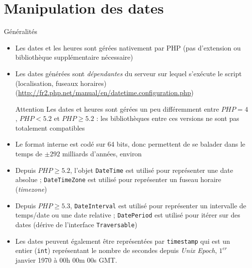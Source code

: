 
\section{Manipulation des dates}

\begin{frame}{Généralités}
	\begin{itemize}
		\item Les dates et les heures sont gérées nativement par PHP (pas d’extension ou bibliothèque supplémentaire nécessaire)
		\item Les dates générées sont \emph{dépendantes} du serveur sur lequel s’exécute le script (localisation, fuseaux horaires) (\url{http://fr2.php.net/manual/en/datetime.configuration.php})
		\begin{alertblock}{Attention}
			Les dates et heures sont gérées un peu différemment entre $PHP=4$, $PHP<5.2$ et $PHP\ge5.2$ : les bibliothèques entre ces versions ne sont pas totalement compatibles
		\end{alertblock}
		\item Le format interne est codé sur 64 bits, donc permettent de se balader dans le temps de $\pm292$ milliards d’années, environ
		\item Depuis $PHP\ge5.2$, l’objet \texttt{DateTime} est utilisé pour représenter une date absolue ; \texttt{DateTimeZone} est utilisé pour représenter un fuseau horaire (\textit{timezone})
		\item Depuis $PHP\ge5.3$, \texttt{DateInterval} est utilisé pour représenter un intervalle de temps/date ou une date relative ; \texttt{DatePeriod} est utilisé pour itérer sur des dates (dérive de l’interface \texttt{Traversable})
		\item Les dates peuvent également être représentées par \texttt{timestamp} qui est un entier (\texttt{int}) représentant le nombre de secondes depuis \textit{Unix Epoch}, $1^{er}$ janvier 1970 à 00h 00m 00s GMT.
	\end{itemize}
\end{frame}

